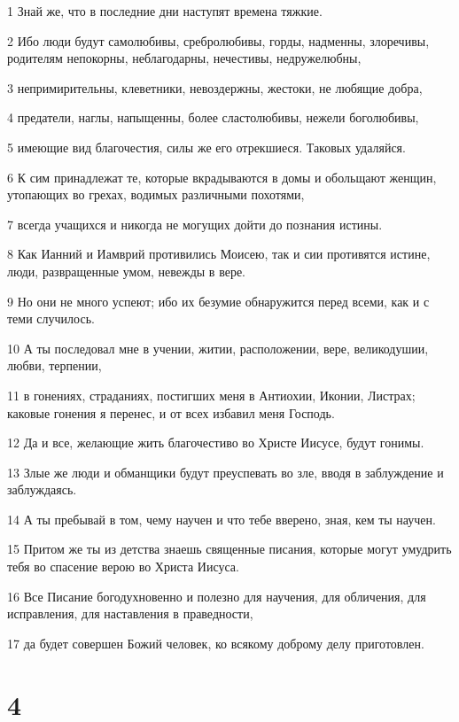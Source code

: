 \par 1 Знай же, что в последние дни наступят времена тяжкие.
\par 2 Ибо люди будут самолюбивы, сребролюбивы, горды, надменны, злоречивы, родителям непокорны, неблагодарны, нечестивы, недружелюбны,
\par 3 непримирительны, клеветники, невоздержны, жестоки, не любящие добра,
\par 4 предатели, наглы, напыщенны, более сластолюбивы, нежели боголюбивы,
\par 5 имеющие вид благочестия, силы же его отрекшиеся. Таковых удаляйся.
\par 6 К сим принадлежат те, которые вкрадываются в домы и обольщают женщин, утопающих во грехах, водимых различными похотями,
\par 7 всегда учащихся и никогда не могущих дойти до познания истины.
\par 8 Как Ианний и Иамврий противились Моисею, так и сии противятся истине, люди, развращенные умом, невежды в вере.
\par 9 Но они не много успеют; ибо их безумие обнаружится перед всеми, как и с теми случилось.
\par 10 А ты последовал мне в учении, житии, расположении, вере, великодушии, любви, терпении,
\par 11 в гонениях, страданиях, постигших меня в Антиохии, Иконии, Листрах; каковые гонения я перенес, и от всех избавил меня Господь.
\par 12 Да и все, желающие жить благочестиво во Христе Иисусе, будут гонимы.
\par 13 Злые же люди и обманщики будут преуспевать во зле, вводя в заблуждение и заблуждаясь.
\par 14 А ты пребывай в том, чему научен и что тебе вверено, зная, кем ты научен.
\par 15 Притом же ты из детства знаешь священные писания, которые могут умудрить тебя во спасение верою во Христа Иисуса.
\par 16 Все Писание богодухновенно и полезно для научения, для обличения, для исправления, для наставления в праведности,
\par 17 да будет совершен Божий человек, ко всякому доброму делу приготовлен.

\chapter{4}

